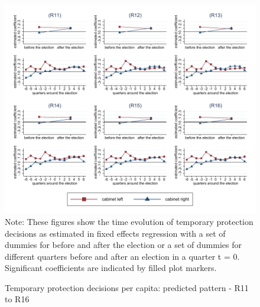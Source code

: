 \documentclass[11pt,a4paper]{scrartcl}
\begin{document}
\clearpage
\FloatBarrier
\begin{figure}[!ht]
	\caption{Temporary protection decisions per capita: predicted pattern - R11 to R16}
	\includegraphics[width=1\textwidth]{../results/decisions/log_temporary_protection_pc_graphs_R11-R16.pdf}
	\scriptsize{Note: These figures show the time evolution of temporary protection decisions as estimated in fixed effects regression with a set of dummies for before and after the election or a set of dummies for different quarters before and after an election in a quarter t = 0. Significant coefficients are indicated by filled plot markers.}
\end{figure}

\clearpage
\FloatBarrier




\clearpage
\FloatBarrier

\end{document}
